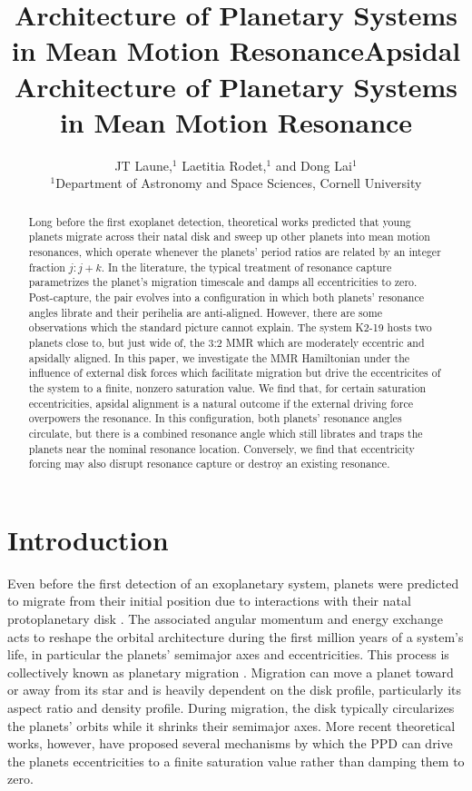 \documentclass[usenatbib,twocolumn]{mnras}
\title[MMR Architecture]{Architecture of Planetary Systems in Mean Motion Resonance}
\author[Laune et al.]{
JT Laune,$^{1}$
Laetitia Rodet,$^{1}$
and Dong Lai$^{1}$
\\
$^{1}$Department of Astronomy and Space Sciences, Cornell University\\}
\date{}
\title{Apsidal Architecture of Planetary Systems in Mean Motion Resonance}
\begin{document}
\maketitle
\begin{abstract} Long before the first exoplanet detection,
theoretical works predicted that young planets migrate across their
natal disk and sweep up other planets into mean motion resonances,
which operate whenever the planets' period ratios are related by an
integer fraction $j:j+k$.  In the literature, the typical treatment of
resonance capture parametrizes the planet's migration timescale and
damps all eccentricities to zero.  Post-capture, the pair evolves into
a configuration in which both planets' resonance angles librate and
their perihelia are anti-aligned.  However, there are some
observations which the standard picture cannot explain. The system
K2-19 hosts two planets close to, but just wide of, the 3:2 MMR which
are moderately eccentric and apsidally aligned.  In this paper, we
investigate the MMR Hamiltonian under the influence of external disk
forces which facilitate migration but drive the eccentricites of the
system to a finite, nonzero saturation value.  We find that, for
certain saturation eccentricities, apsidal alignment is a natural
outcome if the external driving force overpowers the resonance.  In
this configuration, both planets' resonance angles circulate, but
there is a combined resonance angle which still librates and traps the
planets near the nominal resonance location.  Conversely, we find that
eccentricity forcing may also disrupt resonance capture or destroy an
existing resonance.
\end{abstract}

\section{Introduction}
\label{sec:org694a4b9}
Even before the first detection of an exoplanetary system, planets
were predicted to migrate from their initial position due to
interactions with their natal protoplanetary disk
\citep[PPD, ][]{lin79_tidal_torques_accret_discs_binar,goldreich_excitation_1979,goldreich_disk-satellite_1980-1,moutamid14_coupl_between_corot_lindb_reson}.
The associated angular momentum and energy exchange acts to reshape
the orbital architecture during the first million years of a system's
life, in particular the planets' semimajor axes and eccentricities.
This process is collectively known as planetary migration
\citep{nelson_planetary_2018}.  Migration can move a planet toward or
away from its star and is heavily dependent on the disk profile,
particularly its aspect ratio and density profile.  During migration,
the disk typically circularizes the planets' orbits while it shrinks
their semimajor axes.  More recent theoretical works, however, have
proposed several mechanisms by which the PPD can drive the planets
eccentricities to a finite saturation value rather than damping them
to zero.
\end{document}
